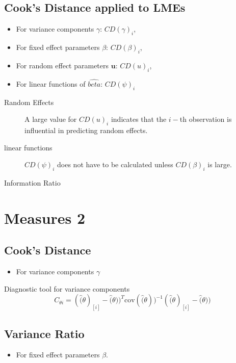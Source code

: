 \subsection{Cook's Distance applied to LMEs}
\begin{itemize}
\item For variance components $\gamma$: $CD(\gamma)_i$,
\item For fixed effect parameters $\beta$: $CD(\beta)_i$,
\item For random effect parameters $\boldsymbol{u}$: $CD(u)_i$,
\item For linear functions of $\hat{beta}$: $CD(\psi)_i$
\end{itemize}


\begin{description}
\item[Random Effects]

A large value for $CD(u)_i$ indicates that the $i-$th observation is influential in predicting random effects.

\item[linear functions]
$CD(\psi)_i$ does not have to be calculated unless $CD(\beta)_i$ is large.


\item[Information Ratio]
\end{description}

\newpage
\section{Measures 2} %

\subsection{Cook's Distance} %
\begin{itemize}
\item For variance components $\gamma$
\end{itemize}

Diagnostic tool for variance components
\[ C_{\theta i} =(\hat(\theta)_{[i]} - \hat(\theta))^{T}\mbox{cov}( \hat(\theta))^{-1}(\hat(\theta)_{[i]} - \hat(\theta))\]

\subsection{Variance Ratio} %
\begin{itemize}
\item For fixed effect parameters $\beta$.
\end{itemize}

